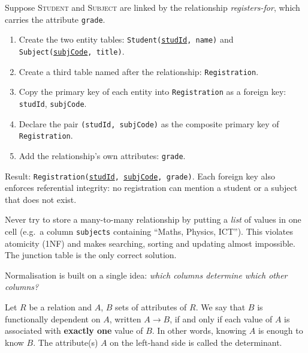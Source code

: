 \documentclass[11pt]{article}
\newcommand{\cle}[1]{{\popxbold\color{popdark}#1}}
\newcounter{popsec}
\newcounter{popsub}
\newcommand{\courssub}[1]{%
  \stepcounter{popsub}%
  \par\vspace{9pt}\noindent{\popxbold\fontsize{11.5}{13}\selectfont\color{popink}{\color{poporange}\thepopsec.\thepopsub}\hspace{6pt}#1}\par\nopagebreak\vspace{4pt}
}
\begin{document}
\begin{methode}
Suppose \textsc{Student} and \textsc{Subject} are linked by the relationship \emph{registers-for}, which carries the attribute \texttt{grade}.
\begin{enumerate}
\item Create the two entity tables: \texttt{Student(\underline{studId}, name)} and \texttt{Subject(\underline{subjCode}, title)}.
\item Create a third table named after the relationship: \texttt{Registration}.
\item Copy the primary key of each entity into \texttt{Registration} as a foreign key: \texttt{studId}, \texttt{subjCode}.
\item Declare the pair \texttt{(studId, subjCode)} as the composite primary key of \texttt{Registration}.
\item Add the relationship's own attributes: \texttt{grade}.
\end{enumerate}
Result: \texttt{Registration(\underline{studId}, \underline{subjCode}, grade)}. Each foreign key also enforces referential integrity: no registration can mention a student or a subject that does not exist.
\end{methode}

\begin{attention}
Never try to store a many-to-many relationship by putting a \emph{list} of values in one cell (e.g.\ a column \texttt{subjects} containing ``Maths, Physics, ICT''). This violates atomicity (1NF) and makes searching, sorting and updating almost impossible. The junction table is the only correct solution.
\end{attention}

\courssub{Functional Dependencies}

Normalisation is built on a single idea: \emph{which columns determine which other columns?}

\begin{definition}
Let $R$ be a relation and $A$, $B$ sets of attributes of $R$. We say that $B$ is \cle{functionally dependent} on $A$, written $A \to B$, if and only if each value of $A$ is associated with \textbf{exactly one} value of $B$. In other words, knowing $A$ is enough to know $B$. The attribute(s) $A$ on the left-hand side is called the \cle{determinant}.
\end{definition}
\end{document}
